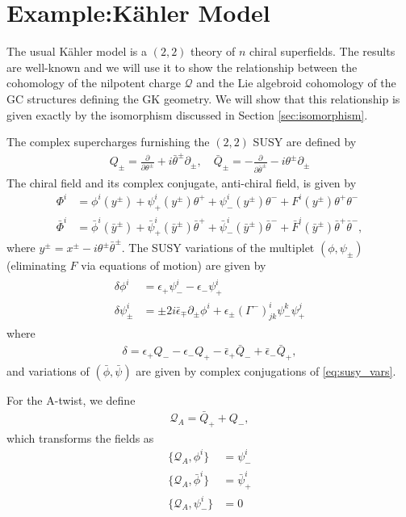 \documentclass{article}
\newcommand{\QQ}{\mathcal{Q}}
\newcommand{\p}{\partial}
\theoremstyle{definition}
\theoremstyle{definition}
\theoremstyle{remark}
\begin{document}
\section*{Example:K\"ahler Model}
The usual K\"ahler model is a $(2,2)$ theory of $n$ chiral superfields. The results are well-known and we will use it to show the relationship between the cohomology of the nilpotent charge $\QQ$ and the Lie algebroid cohomology of the GC structures defining the GK geometry. We will show that this relationship is given exactly by the isomorphism discussed in Section \ref{sec:isomorphism}.

The complex supercharges furnishing the $(2,2)$ SUSY are defined by
\begin{align*}
Q_\pm=\frac{\p}{\p \theta^\pm}+i\bar{\theta}^\pm\p_\pm,\quad \bar{Q}_\pm=-\frac{\p}{\p \bar{\theta}^\pm}-i\theta^\pm\p_\pm
\end{align*}
The chiral field and its complex conjugate, anti-chiral field, is given by
\begin{align*}
\Phi^i&=\phi^i(y^\pm)+\psi^i_+(y^\pm)\theta^++\psi^i_-(y^\pm)\theta^-+F^i(y^\pm)\theta^+\theta^-\\
\bar{\Phi}^i&=\bar{\phi}^i(\bar{y}^\pm)+\bar{\psi}^i_+(\bar{y}^\pm)\bar{\theta}^++\bar{\psi}^i_-(\bar{y}^\pm)\bar{\theta}^-+\bar{F}^i(\bar{y}^\pm)\bar{\theta}^+\bar{\theta}^-,
\end{align*}
where $y^\pm=x^\pm-i\theta^\pm\bar{\theta}^\pm$. The SUSY variations of the multiplet $(\phi,\psi_\pm)$ (eliminating $F$ via equations of motion) are given by
\begin{align}\label{eq:susy_vars}
\begin{aligned}
\delta \phi^i &= \epsilon_+ \psi^i_--\epsilon_- \psi^i_+\\
\delta \psi^i_\pm &= \pm 2i\bar{\epsilon}_\mp\p_\pm \phi^i+\epsilon_\pm (\Gamma^-)^{i}_{jk}\psi_-^k\psi_+^j
\end{aligned}
\end{align}
where
\begin{align*}
\delta=\epsilon_+Q_--\epsilon_-Q_+-\bar{\epsilon}_+\bar{Q}_-+\bar{\epsilon}_-\bar{Q}_+,
\end{align*}
and variations of $(\bar{\phi},\bar{\psi})$ are given by complex conjugations of \eqref{eq:susy_vars}.

For the A-twist, we define
\begin{align*}
\QQ_A=\bar{Q}_++Q_-,
\end{align*}
which transforms the fields as
\begin{align*}
\{\QQ_A, \phi^i\}&=\psi^i_-\\
\{\QQ_A, \bar{\phi}^i\}&=\bar{\psi}^i_+\\
\{\QQ_A, \psi^i_-\}&=0
\end{align*}
\end{document}
